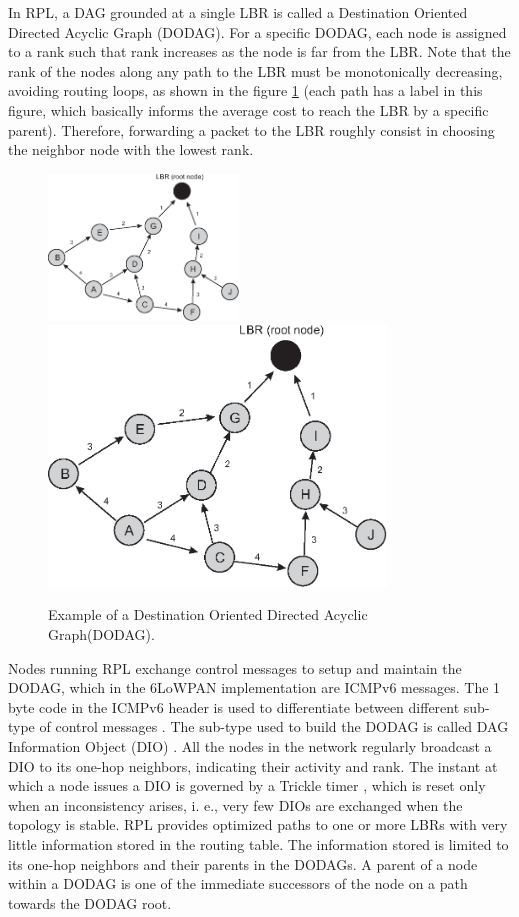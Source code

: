 \documentclass[final,authoryear,3p,twocolumn]{elsarticle}
\begin{document}
In RPL, a DAG grounded at a single LBR is called a Destination Oriented Directed Acyclic Graph (DODAG). For a specific DODAG, each node is assigned to a rank such that rank increases as the node is far from the LBR. Note that the rank of the nodes along any path to the LBR must be monotonically decreasing, avoiding routing loops, as shown in the figure \ref{RPL_DIO} (each path has a label in this figure, which basically informs the average cost to reach the LBR by a specific parent). Therefore, forwarding a packet to the LBR roughly consist in choosing the neighbor node with the lowest rank.

\begin{figure}[h!tb]
\centering
\ifdefined\TWOCOL
\includegraphics[width=0.45\textwidth]{figures/RPL_DIO}
\else
\includegraphics[width=0.8\textwidth]{figures/RPL_DIO}
\fi
\caption{Example of a Destination Oriented Directed Acyclic Graph(DODAG).}
\label{RPL_DIO}
\end{figure}

Nodes running RPL exchange control messages to setup and maintain the DODAG, which in the 6LoWPAN implementation are ICMPv6 messages. The 1 byte code in the ICMPv6 header is used to differentiate between different sub-type of control messages \citep{RFC4443}. The sub-type used to build the DODAG is called DAG Information Object (DIO) \citep{RFC6550}. All the nodes in the network regularly broadcast a DIO to its one-hop neighbors, indicating their activity and rank. The instant at which a node issues a DIO is governed by a Trickle timer \citep{trickle}, which is reset only when an inconsistency arises, i. e., very few DIOs are exchanged when the topology is stable. RPL provides optimized paths to one or more LBRs with very little information stored in the routing table. The information stored is limited to its one-hop neighbors and their parents in the DODAGs. A parent of a node within a DODAG is one of the immediate successors of the node on a path towards the DODAG root.
\end{document}
